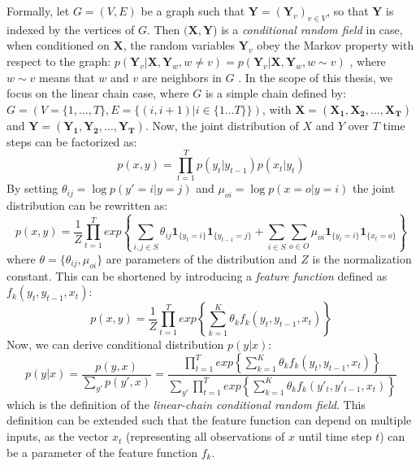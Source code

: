 Formally, let $G = (V, E)$ be a graph such that $\mathbf{Y} = (\mathbf{Y}_v)_{v
\in V}$, so that $\mathbf{Y}$ is indexed by the vertices of $G$. Then
$(\mathbf{X}, \mathbf{Y}$) is a \textit{conditional random field} in case, when
conditioned on $\mathbf{X}$, the random variables $\mathbf{Y}_v$ obey the
Markov property with respect to the graph: $p(\mathbf{Y}_v | \mathbf{X},
\mathbf{Y}_w, w \neq v) = p(\mathbf{Y}_v | \mathbf{X}, \mathbf{Y}_w, w \sim v)$
, where $w \sim v$ means that $w$ and $v$ are neighbors in $G$
\citep{lafferty2001conditional}. 
In the scope of this thesis, we focus on the linear chain case, where $G$ is a simple chain
defined by: $G = (V = \{1, \dots, T\}, E = \{(i, i + 1)| i \in \{1 \dots T\} \})$, with 
$\mathbf{X} = (\mathbf{X_1}, \mathbf{X_2}, \dots, \mathbf{X_T})$
and $\mathbf{Y} = (\mathbf{Y_1}, \mathbf{Y_2}, \dots, \mathbf{Y_T})$.
Now, the joint distribution of $X$ and $Y$ over $T$ time steps 
can be factorized as:
$$
p(x, y) = \prod_{t=1}^{T} p(y_t | y_{t - 1}) p(x_t | y_t)
$$
By setting $\theta_{ij} = \log p(y' = i | y = j)$ and
$\mu_{oi} = \log p(x = o | y = i)$ the joint distribution
can be rewritten as:
$$
p(x, y) = \frac{1}{Z} \prod_{t=1}^{T} exp \left\{ \sum_{i, j \in S} \theta_{ij} \mathbf{1}_{\{y_t=i\}} \mathbf{1}_{\{y_{t-1} = j\}}
+ \sum_{i \in S} \sum_{o \in O} \mu_{oi} \mathbf{1}_{\{y_t = i\}}\mathbf{1}_{\{x_t  = o\}} \right\}
$$
where $\theta = \{\theta_{ij}, \mu_{oi}\}$ are parameters of the distribution and $Z$ is the
normalization constant. This can be shortened by 
introducing a \textit{feature function}
defined as $f_k (y_t, y_{t - 1}, x_t)$:
$$
p(x, y) = \frac{1}{Z} \prod_{t=1}^{T} exp \left\{ \sum_{k=1}^{K} \theta_k f_k(y_t, y_{t - 1}, x_t) \right\}
$$
Now, we can derive conditional distribution $p(y | x)$:
\begin{equation}\label{eq:cond_crf}
p(y | x) = \frac{p(y, x)}{\sum_{y'} p(y', x)}  = 
\frac{\prod_{t=1}^{T} exp \left\{ \sum_{k=1}^{K} \theta_k f_k(y_t, y_{t - 1}, x_t) \right\}}
{\sum_{y'} \prod_{t=1}^{T} exp \left\{ \sum_{k=1}^{K} \theta_k f_k(y'_t, y'_{t - 1}, x_t) \right\}}
\end{equation}
which is the definition of the \textit{linear-chain conditional random field}.
This definition can be extended such that the feature function can depend on 
multiple inputs, as the vector $x_t$ (representing all observations of $x$
until time step $t$) can be a parameter of the feature function $f_k$. 

